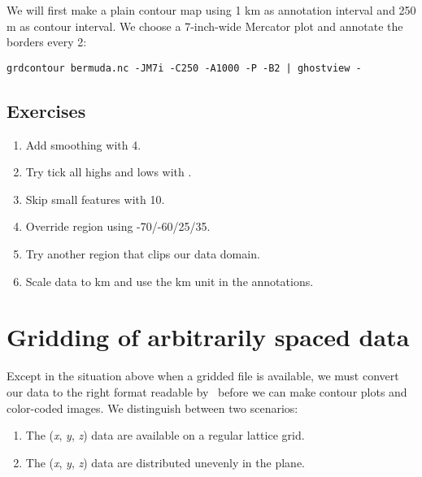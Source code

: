 \documentclass{report}
\begin{document}
We will first make a plain contour map using 1 km as annotation
interval and 250 m as contour interval.  We choose a 7-inch-wide
Mercator plot and annotate the borders every 2\DS:

\begin{verbatim} 
grdcontour bermuda.nc -JM7i -C250 -A1000 -P -B2 | ghostview -
\end{verbatim}

\subsection{Exercises}

\begin{enumerate}

\item Add smoothing with 4.

\item Try tick all highs and lows with .

\item Skip small features with 10.

\item Override region using -70/-60/25/35.

\item Try another region that clips our data domain.

\item Scale data to km and use the km unit in the annotations.

\end{enumerate}

\section{Gridding of arbitrarily spaced data} 

Except in the situation above when a gridded file is available, we must
convert our data to the right format readable by \GMT\ before we can
make contour plots and color-coded images.  We distinguish between
two scenarios:

\begin{enumerate}

\item The ({\it x}, {\it y}, {\it z}) data are available on a regular
lattice grid.

\item The ({\it x}, {\it y}, {\it z}) data are distributed unevenly
in the plane.

\end{enumerate}
\end{document}
